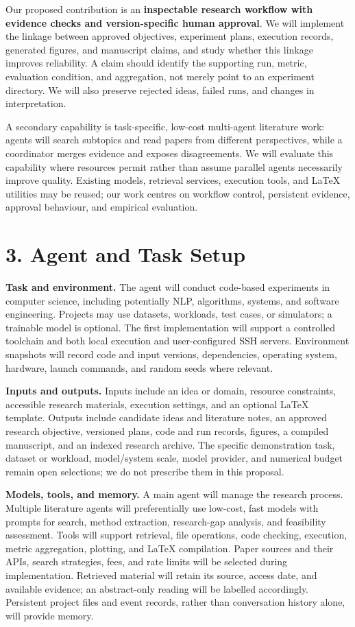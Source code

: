 \documentclass[11pt]{article}
\begin{document}
Our proposed contribution is an \textbf{inspectable research workflow with evidence checks and version-specific human approval}. We will implement the linkage between approved objectives, experiment plans, execution records, generated figures, and manuscript claims, and study whether this linkage improves reliability. A claim should identify the supporting run, metric, evaluation condition, and aggregation, not merely point to an experiment directory. We will also preserve rejected ideas, failed runs, and changes in interpretation.

A secondary capability is task-specific, low-cost multi-agent literature work: agents will search subtopics and read papers from different perspectives, while a coordinator merges evidence and exposes disagreements. We will evaluate this capability where resources permit rather than assume parallel agents necessarily improve quality. Existing models, retrieval services, execution tools, and LaTeX utilities may be reused; our work centres on workflow control, persistent evidence, approval behaviour, and empirical evaluation.

\section*{3. Agent and Task Setup}

\noindent\textbf{Task and environment.} The agent will conduct code-based experiments in computer science, including potentially NLP, algorithms, systems, and software engineering. Projects may use datasets, workloads, test cases, or simulators; a trainable model is optional. The first implementation will support a controlled toolchain and both local execution and user-configured SSH servers. Environment snapshots will record code and input versions, dependencies, operating system, hardware, launch commands, and random seeds where relevant.

\noindent\textbf{Inputs and outputs.} Inputs include an idea or domain, resource constraints, accessible research materials, execution settings, and an optional LaTeX template. Outputs include candidate ideas and literature notes, an approved research objective, versioned plans, code and run records, figures, a compiled manuscript, and an indexed research archive. The specific demonstration task, dataset or workload, model/system scale, model provider, and numerical budget remain open selections; we do not prescribe them in this proposal.

\noindent\textbf{Models, tools, and memory.} A main agent will manage the research process. Multiple literature agents will preferentially use low-cost, fast models with prompts for search, method extraction, research-gap analysis, and feasibility assessment. Tools will support retrieval, file operations, code checking, execution, metric aggregation, plotting, and LaTeX compilation. Paper sources and their APIs, search strategies, fees, and rate limits will be selected during implementation. Retrieved material will retain its source, access date, and available evidence; an abstract-only reading will be labelled accordingly. Persistent project files and event records, rather than conversation history alone, will provide memory.
\end{document}
